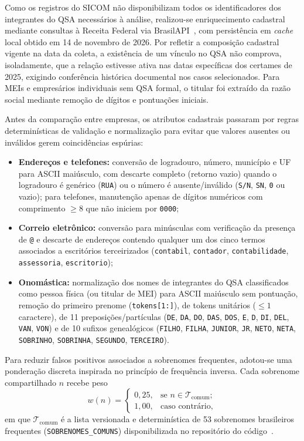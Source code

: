 Como os registros do SICOM não disponibilizam todos os identificadores dos integrantes do QSA necessários à análise, realizou-se enriquecimento cadastral mediante consultas à Receita Federal via BrasilAPI~\cite{brasilapi2026cnpj}, com persistência em \textit{cache} local obtido em 14 de novembro de 2026. Por refletir a composição cadastral vigente na data da coleta, a existência de um vínculo no QSA não comprova, isoladamente, que a relação estivesse ativa nas datas específicas dos certames de 2025, exigindo conferência histórica documental nos casos selecionados. Para MEIs e empresários individuais sem QSA formal, o titular foi extraído da razão social mediante remoção de dígitos e pontuações iniciais.

Antes da comparação entre empresas, os atributos cadastrais passaram por regras determinísticas de validação e normalização para evitar que valores ausentes ou inválidos gerem coincidências espúrias:
\begin{itemize}
  \item \textbf{Endereços e telefones:} conversão de logradouro, número, município e UF para ASCII maiúsculo, com descarte completo (retorno vazio) quando o logradouro é genérico (\texttt{RUA}) ou o número é ausente/inválido (\texttt{S/N}, \texttt{SN}, \texttt{0} ou vazio); para telefones, manutenção apenas de dígitos numéricos com comprimento $\ge 8$ que não iniciem por \texttt{0000};
  \item \textbf{Correio eletrônico:} conversão para minúsculas com verificação da presença de \texttt{@} e descarte de endereços contendo qualquer um dos cinco termos associados a escritórios terceirizados (\texttt{contabil}, \texttt{contador}, \texttt{contabilidade}, \texttt{assessoria}, \texttt{escritorio});
  \item \textbf{Onomástica:} normalização dos nomes de integrantes do QSA classificados como pessoa física (ou titular de MEI) para ASCII maiúsculo sem pontuação, remoção do primeiro prenome (\texttt{tokens[1:]}), de tokens unitários ($\le 1$ caractere), de 11 preposições/partículas (\texttt{DE}, \texttt{DA}, \texttt{DO}, \texttt{DAS}, \texttt{DOS}, \texttt{E}, \texttt{D}, \texttt{DI}, \texttt{DEL}, \texttt{VAN}, \texttt{VON}) e de 10 sufixos genealógicos (\texttt{FILHO}, \texttt{FILHA}, \texttt{JUNIOR}, \texttt{JR}, \texttt{NETO}, \texttt{NETA}, \texttt{SOBRINHO}, \texttt{SOBRINHA}, \texttt{SEGUNDO}, \texttt{TERCEIRO}).
\end{itemize}

Para reduzir falsos positivos associados a sobrenomes frequentes, adotou-se uma ponderação discreta inspirada no princípio de frequência inversa. Cada sobrenome compartilhado $n$ recebe peso
\begin{equation}
w(n)=
\begin{cases}
0{,}25, & \text{se } n \in \mathcal{T}_{\mathrm{comum}};\\
1{,}00, & \text{caso contrário},
\end{cases}
\end{equation}
em que $\mathcal{T}_{\mathrm{comum}}$ é a lista versionada e determinística de 53 sobrenomes brasileiros frequentes (\texttt{SOBRENOMES\_COMUNS}) disponibilizada no repositório do código~\cite{projeto_github}.


